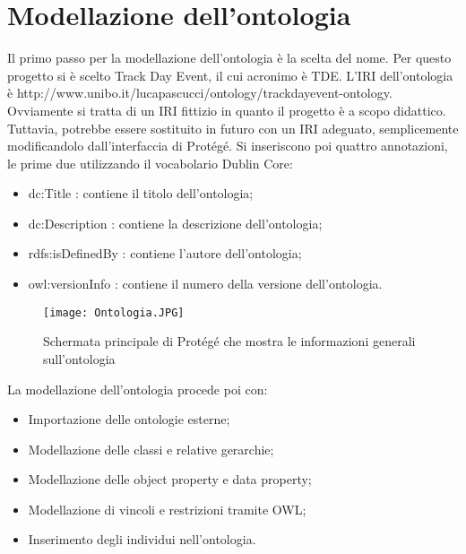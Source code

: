 \section{Modellazione dell’ontologia}
Il primo passo per la modellazione dell'ontologia è la scelta del nome. Per questo progetto si è scelto Track Day Event, il cui acronimo è TDE. L’IRI dell’ontologia è http://www.unibo.it/lucapascucci/ontology/trackdayevent-ontology. Ovviamente si tratta di un IRI fittizio in quanto il progetto è a scopo didattico. Tuttavia, potrebbe essere sostituito in futuro con un IRI adeguato, semplicemente modificandolo dall'interfaccia di Protégé. 
Si inseriscono poi quattro annotazioni, le prime due utilizzando il vocabolario Dublin Core:
\begin{itemize}
\item dc:Title : contiene il titolo dell'ontologia; 
\item dc:Description : contiene la descrizione dell'ontologia;
\item rdfs:isDefinedBy : contiene l'autore dell'ontologia;
\item owl:versionInfo : contiene il numero della versione dell'ontologia.
\end{itemize}
\begin{figure}[h]
	\centering
	\texttt{[image: Ontologia.JPG]}
	\caption{Schermata principale di Protégé che mostra le informazioni generali sull'ontologia}
\end{figure}
\clearpage
La modellazione dell'ontologia procede poi con: 
\begin{itemize}
\item Importazione delle ontologie esterne;
\item Modellazione delle classi e relative gerarchie;
\item Modellazione delle object property e data property;
\item Modellazione di vincoli e restrizioni tramite OWL;
\item Inserimento degli individui nell'ontologia.
\end{itemize}
